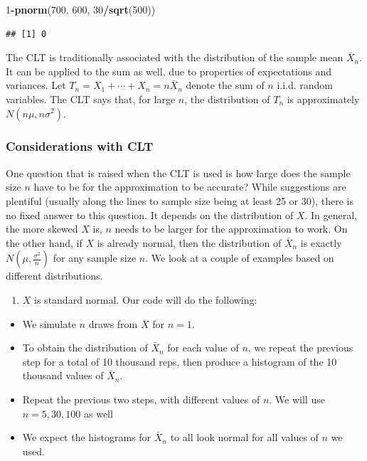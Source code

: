 \documentclass[
]{book}
\newenvironment{Shaded}{\begin{snugshade}}{\end{snugshade}}
\newcommand{\DecValTok}[1]{\textcolor[rgb]{0.00,0.00,0.81}{#1}}
\newcommand{\FunctionTok}[1]{\textcolor[rgb]{0.13,0.29,0.53}{\textbf{#1}}}
\newcommand{\NormalTok}[1]{#1}
\newcommand{\SpecialCharTok}[1]{\textcolor[rgb]{0.81,0.36,0.00}{\textbf{#1}}}
\providecommand{\tightlist}{%
  \setlength{\itemsep}{0pt}\setlength{\parskip}{0pt}}
\begin{document}
\begin{Shaded}
\begin{Highlighting}[]
\DecValTok{1}\SpecialCharTok{{-}}\FunctionTok{pnorm}\NormalTok{(}\DecValTok{700}\NormalTok{, }\DecValTok{600}\NormalTok{, }\DecValTok{30}\SpecialCharTok{/}\FunctionTok{sqrt}\NormalTok{(}\DecValTok{500}\NormalTok{))}
\end{Highlighting}
\end{Shaded}

\begin{verbatim}
## [1] 0
\end{verbatim}

The CLT is traditionally associated with the distribution of the sample mean \(\bar{X}_n\). It can be applied to the sum as well, due to properties of expectations and variances. Let \(T_n = X_1 + \cdots + X_n = n \bar{X}_n\) denote the sum of \(n\) i.i.d. random variables. The CLT says that, for large \(n\), the distribution of \(T_n\) is approximately \(N(n\mu, n\sigma^2)\).

\hypertarget{considerCLT}{%
\subsubsection{Considerations with CLT}\label{considerCLT}}

One question that is raised when the CLT is used is how large does the sample size \(n\) have to be for the approximation to be accurate? While suggestions are plentiful (usually along the lines to sample size being at least 25 or 30), there is no fixed answer to this question. It depends on the distribution of \(X\). In general, the more skewed \(X\) is, \(n\) needs to be larger for the approximation to work. On the other hand, if \(X\) is already normal, then the distribution of \(\bar{X}_n\) is exactly \(N(\mu, \frac{\sigma^2}{n})\) for any sample size \(n\). We look at a couple of examples based on different distributions.

\begin{enumerate}
\def\labelenumi{\arabic{enumi}.}
\tightlist
\item
  \(X\) is standard normal. Our code will do the following:
\end{enumerate}

\begin{itemize}
\tightlist
\item
  We simulate \(n\) draws from \(X\) for \(n = 1\).
\item
  To obtain the distribution of \(\bar{X}_n\) for each value of \(n\), we repeat the previous step for a total of 10 thousand reps, then produce a histogram of the 10 thousand values of \(\bar{X}_n\).
\item
  Repeat the previous two steps, with different values of \(n\). We will use \(n= 5, 30, 100\) as well
\item
  We expect the histograms for \(\bar{X}_n\) to all look normal for all values of \(n\) we used.
\end{itemize}
\end{document}
